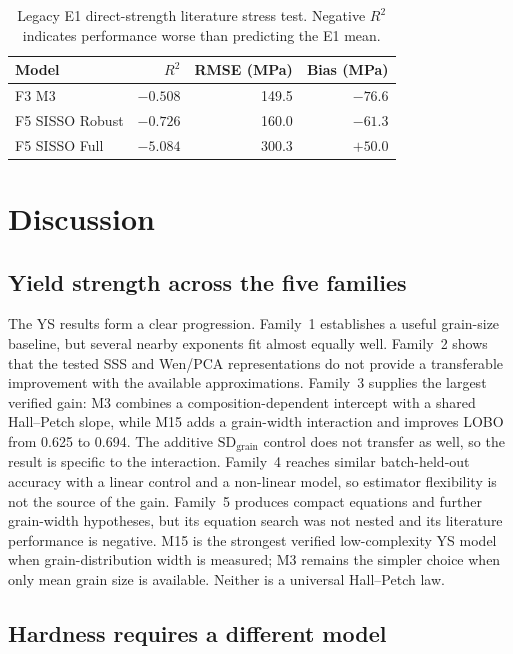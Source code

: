 \documentclass[5p,times,twocolumn]{elsarticle}
\begin{document}
\begin{table}[t]
\centering
\caption{Legacy E1 direct-strength literature stress test. Negative $R^2$ indicates performance worse than predicting the E1 mean.}
\label{tab:external}
\small
\begin{tabular}{lrrr}
\toprule
Model & $R^2$ & RMSE (MPa) & Bias (MPa) \\
\midrule
F3 M3 & $-0.508$ & 149.5 & $-76.6$ \\
F5 SISSO Robust & $-0.726$ & 160.0 & $-61.3$ \\
F5 SISSO Full & $-5.084$ & 300.3 & $+50.0$ \\
\bottomrule
\end{tabular}
\end{table}

\section{Discussion}
\label{sec:discussion}

\subsection{Yield strength across the five families}

The YS results form a clear progression. Family~1 establishes a useful grain-size baseline, but several nearby exponents fit almost equally well. Family~2 shows that the tested SSS and Wen/PCA representations do not provide a transferable improvement with the available approximations. Family~3 supplies the largest verified gain: M3 combines a composition-dependent intercept with a shared Hall--Petch slope, while M15 adds a grain-width interaction and improves LOBO from 0.625 to 0.694. The additive $\mathrm{SD}_{\mathrm{grain}}$ control does not transfer as well, so the result is specific to the interaction. Family~4 reaches similar batch-held-out accuracy with a linear control and a non-linear model, so estimator flexibility is not the source of the gain. Family~5 produces compact equations and further grain-width hypotheses, but its equation search was not nested and its literature performance is negative. M15 is the strongest verified low-complexity YS model when grain-distribution width is measured; M3 remains the simpler choice when only mean grain size is available. Neither is a universal Hall--Petch law.

\subsection{Hardness requires a different model}
\end{document}
